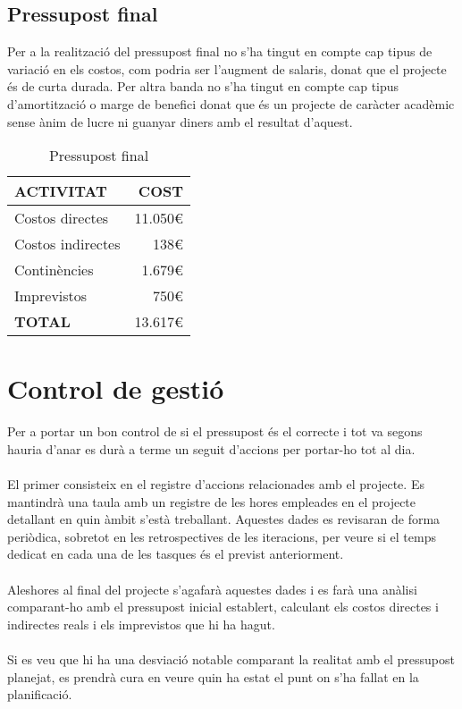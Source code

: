 \subsection{Pressupost final}

Per a la realització del pressupost final no s’ha tingut en compte cap tipus de variació en els costos, com podria ser l’augment de salaris, donat que el projecte és de curta durada. Per altra banda no s’ha tingut en compte cap tipus d’amortització o marge de benefici donat que és un projecte de caràcter acadèmic sense ànim de lucre ni guanyar diners amb el resultat d’aquest.
\\
\begin{table}[H]
\centering
\begin{tabular}{ | l | r |}
\hline
\textbf{ACTIVITAT}								&\textbf{COST} 			\\ \hline
Costos directes									& 11.050\euro			\\ \hline
Costos indirectes								& 138\euro				\\ \hline
Continències									& 1.679\euro			\\ \hline
Imprevistos										& 750\euro				\\ \hline
\textbf{TOTAL}					 				& 13.617\euro			\\ 
\hline
\end{tabular}
\caption{Pressupost final}
\end{table}


\section{Control de gestió}

Per a portar un bon control de si el pressupost és el correcte i tot va segons hauria d’anar es durà a terme un seguit d’accions per portar-ho tot al dia.
\\\\
El primer consisteix en el registre d’accions relacionades amb el projecte. Es mantindrà una taula amb un registre de les hores empleades en el projecte detallant en quin àmbit s’està treballant. Aquestes dades es revisaran de forma periòdica, sobretot en les retrospectives de les iteracions, per veure si el temps dedicat en cada una de les tasques és el previst anteriorment.
\\\\
Aleshores al final del projecte s’agafarà aquestes dades i es farà una anàlisi comparant-ho amb el pressupost inicial establert, calculant els costos directes i indirectes reals i els imprevistos que hi ha hagut.
\\\\
Si es veu que hi ha una desviació notable comparant la realitat amb el pressupost planejat, es prendrà cura en veure quin ha estat el punt on s’ha fallat en la planificació.